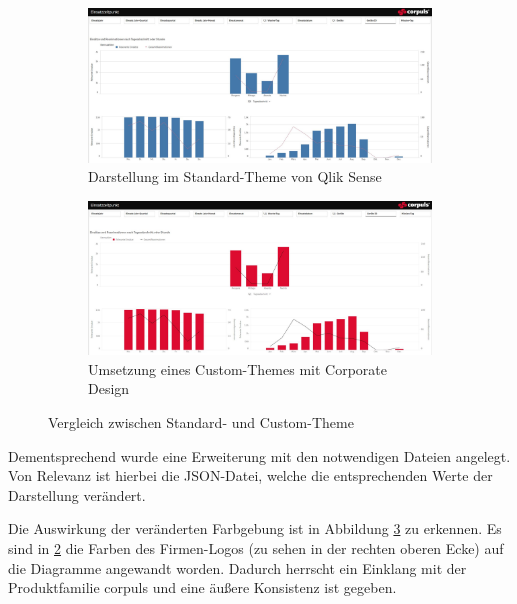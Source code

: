 \begin{figure}[ht]
\centering
\begin{subfigure}{0.9\linewidth}
  \centering
  \includegraphics[width=1\linewidth]{img/beforeCT}  
  \caption{Darstellung im Standard-Theme von Qlik Sense}
  \label{fig:beforeCT}
\end{subfigure}
\begin{subfigure}{0.9\linewidth}
  \centering
  \includegraphics[width=1\linewidth]{img/afterCT}  
  \caption{Umsetzung eines Custom-Themes mit Corporate Design}
  \label{fig:afterCT}
\end{subfigure}
\caption[Vergleich zwischen Standard- und Custom-Theme]{Vergleich zwischen Standard- und Custom-Theme}
\label{fig:custom}
\end{figure}

Dementsprechend wurde eine Erweiterung mit den notwendigen Dateien angelegt.
Von Relevanz ist hierbei die JSON-Datei, welche die entsprechenden Werte der Darstellung verändert.

Die Auswirkung der veränderten Farbgebung ist in Abbildung \ref{fig:custom} zu erkennen. 
Es sind in \ref{fig:afterCT} die Farben des Firmen-Logos (zu sehen in der rechten oberen Ecke) auf die Diagramme angewandt worden.
Dadurch herrscht ein Einklang mit der Produktfamilie \textsf{corpuls\color{corpulsred}{.web}} und eine äußere Konsistenz ist gegeben.



